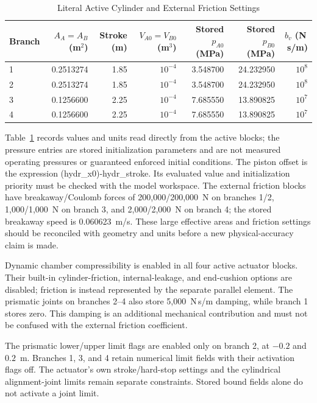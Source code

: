 \begin{table}[t]
\caption{Literal Active Cylinder and External Friction Settings}
\label{tab:cylinders}
\centering\small
\begin{tabular}{lrrrrrr}
\hline
Branch & $A_A=A_B$ (m$^2$) & Stroke (m) & $V_{A0}=V_{B0}$ (m$^3$) & Stored $p_{A0}$ (MPa) & Stored $p_{B0}$ (MPa) & $b_v$ (N\,s/m)\\\hline
1 & 0.2513274 & 1.85 & $10^{-4}$ & 3.548700 & 24.232950 & $10^8$\\
2 & 0.2513274 & 1.85 & $10^{-4}$ & 3.548700 & 24.232950 & $10^8$\\
3 & 0.1256600 & 2.25 & $10^{-4}$ & 7.685550 & 13.890825 & $10^7$\\
4 & 0.1256600 & 2.25 & $10^{-4}$ & 7.685550 & 13.890825 & $10^7$\\\hline
\end{tabular}
\end{table}

Table~\ref{tab:cylinders} records values and units read directly from the active blocks; the pressure entries are stored initialization parameters and are not measured operating pressures or guaranteed enforced initial conditions. The piston offset is the expression \textnormal{(hydr\_x0)-hydr\_stroke}. Its evaluated value and initialization priority must be checked with the model workspace. The external friction blocks have breakaway/Coulomb forces of 200,000/200,000~N on branches 1/2, 1,000/1,000~N on branch 3, and 2,000/2,000~N on branch 4; the stored breakaway speed is 0.060623~m/s. These large effective areas and friction settings should be reconciled with geometry and units before a new physical-accuracy claim is made.

Dynamic chamber compressibility is enabled in all four active actuator blocks. Their built-in cylinder-friction, internal-leakage, and end-cushion options are disabled; friction is instead represented by the separate parallel element. The prismatic joints on branches 2--4 also store 5,000~N\,s/m damping, while branch 1 stores zero. This damping is an additional mechanical contribution and must not be confused with the external friction coefficient.

The prismatic lower/upper limit flags are enabled only on branch 2, at $-0.2$ and $0.2$~m. Branches 1, 3, and 4 retain numerical limit fields with their activation flags off. The actuator's own stroke/hard-stop settings and the cylindrical alignment-joint limits remain separate constraints. Stored bound fields alone do not activate a joint limit.


